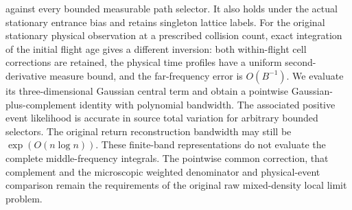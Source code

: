 against every bounded measurable path selector. It also holds under
the actual stationary entrance bias and retains singleton lattice labels.
For the original stationary physical observation at a prescribed collision
count, exact integration of the initial flight age gives a different
inversion: both within-flight cell corrections are retained, the physical
time profiles have a uniform second-derivative measure bound, and the
far-frequency error is $O(B^{-1})$. We evaluate its three-dimensional
Gaussian central term and obtain a pointwise Gaussian-plus-complement
identity with polynomial bandwidth. The associated positive event
likelihood is accurate in source total variation for arbitrary bounded
selectors. The original return reconstruction bandwidth may still be
$\exp(O(n\log n))$.
These finite-band representations do not evaluate the complete
middle-frequency integrals.
The pointwise common correction, that complement and the microscopic
weighted denominator and physical-event comparison remain the
requirements of the original raw mixed-density local limit problem.
